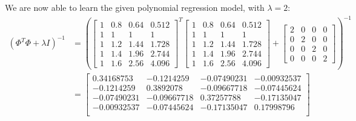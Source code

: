 \documentclass[12pt]{article}
\begin{document}
\begin{enumerate}[leftmargin=\labelsep]
        We are now able to learn the given polynomial regression model, with $\lambda = 2$:
        $$
          \begin{aligned}
            (\Phi^T \Phi + \lambda I)^{-1} & = \left(
            \begin{bmatrix}
              1 & 0.8 & 0.64 & 0.512 \\
              1 & 1   & 1    & 1     \\
              1 & 1.2 & 1.44 & 1.728 \\
              1 & 1.4 & 1.96 & 2.744 \\
              1 & 1.6 & 2.56 & 4.096
            \end{bmatrix}^T
            \begin{bmatrix}
              1 & 0.8 & 0.64 & 0.512 \\
              1 & 1   & 1    & 1     \\
              1 & 1.2 & 1.44 & 1.728 \\
              1 & 1.4 & 1.96 & 2.744 \\
              1 & 1.6 & 2.56 & 4.096
            \end{bmatrix} +
            \begin{bmatrix}
              2 & 0 & 0 & 0 \\
              0 & 2 & 0 & 0 \\
              0 & 0 & 2 & 0 \\
              0 & 0 & 0 & 2
            \end{bmatrix}
            \right)^{-1}                                                                             \\
                                           & = \begin{bmatrix}
                                                 0.34168753  & -0.1214259  & -0.07490231 & -0.00932537 \\
                                                 -0.1214259  & 0.3892078   & -0.09667718 & -0.07445624 \\
                                                 -0.07490231 & -0.09667718 & 0.37257788  & -0.17135047 \\
                                                 -0.00932537 & -0.07445624 & -0.17135047 & 0.17998796  \\
                                               \end{bmatrix}
          \end{aligned}
        $$


\end{enumerate}
\end{document}
